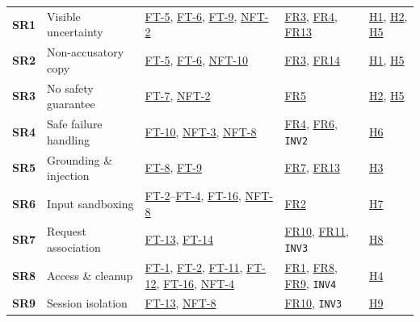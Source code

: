 \documentclass[12pt, titlepage]{article}
\begin{document}
\begin{tabularx}{\textwidth}{P{1.2cm} P{3.9cm} P{3.7cm} P{2.4cm} Y}
\midrule
{}\label{req:SR1}\textbf{SR1} & Visible uncertainty & \hyperref[test:FT-5]{FT-5}, \hyperref[test:FT-6]{FT-6}, \hyperref[test:FT-9]{FT-9}, \hyperref[test:NFT-2]{NFT-2} & \hyperref[req:FR3]{FR3}, \hyperref[req:FR4]{FR4}, \hyperref[req:FR13]{FR13} & \hyperref[haz:H1]{H1}, \hyperref[haz:H2]{H2}, \hyperref[haz:H5]{H5}\\
\label{req:SR2}\textbf{SR2} & Non-accusatory copy & \hyperref[test:FT-5]{FT-5}, \hyperref[test:FT-6]{FT-6}, \hyperref[test:NFT-10]{NFT-10} & \hyperref[req:FR3]{FR3}, \hyperref[req:FR14]{FR14} & \hyperref[haz:H1]{H1}, \hyperref[haz:H5]{H5}\\
\label{req:SR3}\textbf{SR3} & No safety guarantee & \hyperref[test:FT-7]{FT-7}, \hyperref[test:NFT-2]{NFT-2} & \hyperref[req:FR5]{FR5} & \hyperref[haz:H2]{H2}, \hyperref[haz:H5]{H5}\\
\label{req:SR4}\textbf{SR4} & Safe failure handling & \hyperref[test:FT-10]{FT-10}, \hyperref[test:NFT-3]{NFT-3}, \hyperref[test:NFT-8]{NFT-8} & \hyperref[req:FR4]{FR4}, \hyperref[req:FR6]{FR6}, \texttt{INV2} & \hyperref[haz:H6]{H6}\\
\label{req:SR5}\textbf{SR5} & Grounding \& injection & \hyperref[test:FT-8]{FT-8}, \hyperref[test:FT-9]{FT-9} & \hyperref[req:FR7]{FR7}, \hyperref[req:FR13]{FR13} & \hyperref[haz:H3]{H3}\\
\label{req:SR6}\textbf{SR6} & Input sandboxing & \hyperref[test:FT-2]{FT-2}--\hyperref[test:FT-4]{FT-4}, \hyperref[test:FT-16]{FT-16}, \hyperref[test:NFT-8]{NFT-8} & \hyperref[req:FR2]{FR2} & \hyperref[haz:H7]{H7}\\
\label{req:SR7}\textbf{SR7} & Request association & \hyperref[test:FT-13]{FT-13}, \hyperref[test:FT-14]{FT-14} & \hyperref[req:FR10]{FR10}, \hyperref[req:FR11]{FR11}, \texttt{INV3} & \hyperref[haz:H8]{H8}\\
\label{req:SR8}\textbf{SR8} & Access \& cleanup & \hyperref[test:FT-1]{FT-1}, \hyperref[test:FT-2]{FT-2}, \hyperref[test:FT-11]{FT-11}, \hyperref[test:FT-12]{FT-12}, \hyperref[test:FT-16]{FT-16}, \hyperref[test:NFT-4]{NFT-4} & \hyperref[req:FR1]{FR1}, \hyperref[req:FR8]{FR8}, \hyperref[req:FR9]{FR9}, \texttt{INV4} & \hyperref[haz:H4]{H4}\\
\label{req:SR9}\textbf{SR9} & Session isolation & \hyperref[test:FT-13]{FT-13}, \hyperref[test:NFT-8]{NFT-8} & \hyperref[req:FR10]{FR10}, \texttt{INV3} & \hyperref[haz:H9]{H9}\\
\end{tabularx}
\endgroup
\end{document}
